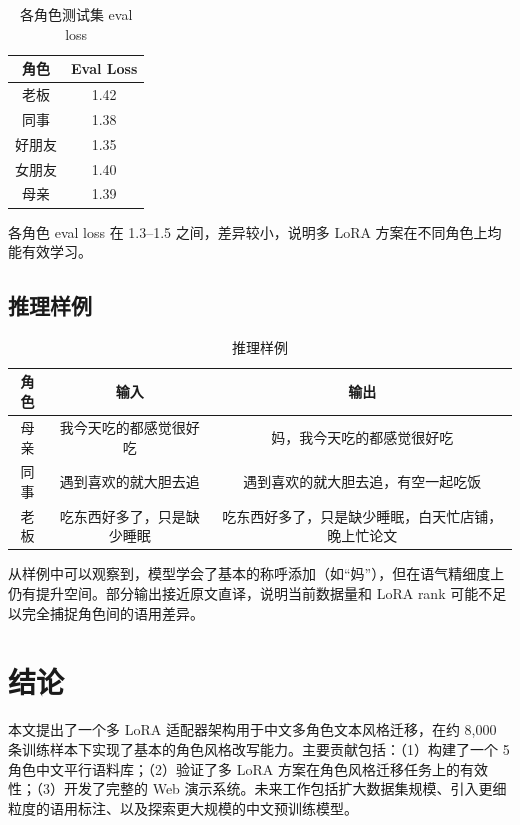 \documentclass[12pt,a4paper]{article}
\begin{document}
\begin{table}[H]
\centering
\caption{各角色测试集 eval loss}
\label{tab:results}
\begin{tabular}{c|c}
\toprule
角色 & Eval Loss \\
\midrule
老板       & 1.42 \\
同事       & 1.38 \\
好朋友     & 1.35 \\
女朋友     & 1.40 \\
母亲       & 1.39 \\
\bottomrule
\end{tabular}
\end{table}

各角色 eval loss 在 1.3--1.5 之间，差异较小，说明多 LoRA 方案在不同角色上均能有效学习。

\subsection{推理样例}

\begin{table}[H]
\centering
\caption{推理样例}
\label{tab:samples}
\small
\begin{tabular}{c|c|c}
\toprule
角色 & 输入 & 输出 \\
\midrule
母亲 & 我今天吃的都感觉很好吃 & 妈，我今天吃的都感觉很好吃 \\
同事 & 遇到喜欢的就大胆去追 & 遇到喜欢的就大胆去追，有空一起吃饭 \\
老板 & 吃东西好多了，只是缺少睡眠 & 吃东西好多了，只是缺少睡眠，白天忙店铺，晚上忙论文 \\
\bottomrule
\end{tabular}
\end{table}

从样例中可以观察到，模型学会了基本的称呼添加（如“妈”），但在语气精细度上仍有提升空间。部分输出接近原文直译，说明当前数据量和 LoRA rank 可能不足以完全捕捉角色间的语用差异。

\section{结论}

本文提出了一个多 LoRA 适配器架构用于中文多角色文本风格迁移，在约 8,000 条训练样本下实现了基本的角色风格改写能力。主要贡献包括：（1）构建了一个 5 角色中文平行语料库；（2）验证了多 LoRA 方案在角色风格迁移任务上的有效性；（3）开发了完整的 Web 演示系统。未来工作包括扩大数据集规模、引入更细粒度的语用标注、以及探索更大规模的中文预训练模型。
\end{document}
